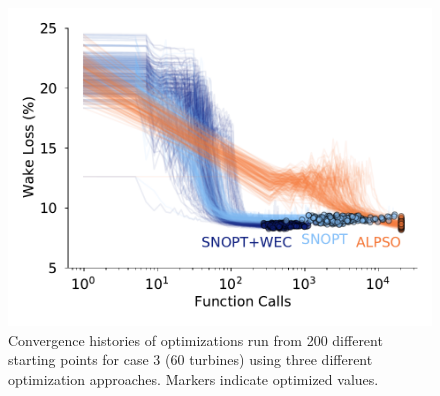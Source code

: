 \documentclass[a4paper]{jpconf}
\begin{document}
%
%
%
%
\begin{figure}[h]
	\centering
	\begin{minipage}[t]{.75\textwidth}
		\centering
		\includegraphics[width=\textwidth]{final_images/results/convergence_history_BPAmodel_60turbs_72dirs}  
		\caption{Convergence histories of optimizations run from 200 different starting points for case 3 (60 turbines) using three different optimization approaches. Markers indicate optimized values.}
		\label{fig:case-3-histories}
	\end{minipage} 
\end{figure}
\end{document}
